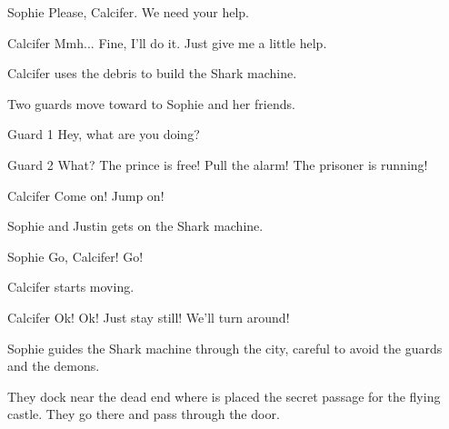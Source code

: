 \begin{screenplay}
\begin{dialogue}{Sophie}
Please, Calcifer. We need your help.
\end{dialogue}

\begin{dialogue}{Calcifer}
Mmh... Fine, I'll do it. Just give me a little help.
\end{dialogue}

Calcifer uses the debris to build the Shark machine.

Two guards move toward to Sophie and her friends.

\begin{dialogue}{Guard 1}
Hey, what are you doing?
\end{dialogue}

\begin{dialogue}[screaming]{Guard 2}
What? The prince is free! Pull the alarm! The prisoner is running!
\end{dialogue}

\begin{dialogue}[worried]{Calcifer}
Come on! Jump on!
\end{dialogue}

Sophie and Justin gets on the Shark machine.

\begin{dialogue}[in a hurry]{Sophie}
Go, Calcifer! Go!
\end{dialogue}

Calcifer starts moving.

\begin{dialogue}[worried]{Calcifer}
Ok! Ok! Just stay still! We'll turn around!
\end{dialogue}

\end{screenplay}
\vspace{1em}

Sophie guides the Shark machine through the city, careful to avoid the guards and the demons.

They dock near the dead end where is placed the secret passage for the flying castle. They go there and pass through the door.
